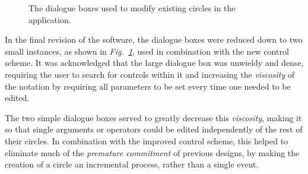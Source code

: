 \documentclass[12pt,twoside,notitlepage,xetex]{report}
\begin{document}
\begin{center}
\begin{figure}[H]
\begin{center}
\end{center}
\caption{The dialogue boxes used to modify existing circles in the application.}
\label{fig:Dialogues}
\end{figure}
\end{center}

In the final revision of the software, the dialogue boxes were reduced down to two small instances, as shown in \emph{Fig.~\ref{fig:Dialogues}}, used in combination with the new control scheme.  It was acknowledged that the large dialogue box was unwieldy and dense, requiring the user to search for controls within it and increasing the \emph{viscosity} of the notation by requiring all parameters to be set every time one needed to be edited.

The two simple dialogue boxes served to greatly decrease this \emph{viscosity}, making it so that single arguments or operators could be edited independently of the rest of their circles.  In combination with the improved control scheme, this helped to eliminate much of the \emph{premature commitment} of previous designs, by making the creation of a circle an incremental process, rather than a single event.
\end{document}
